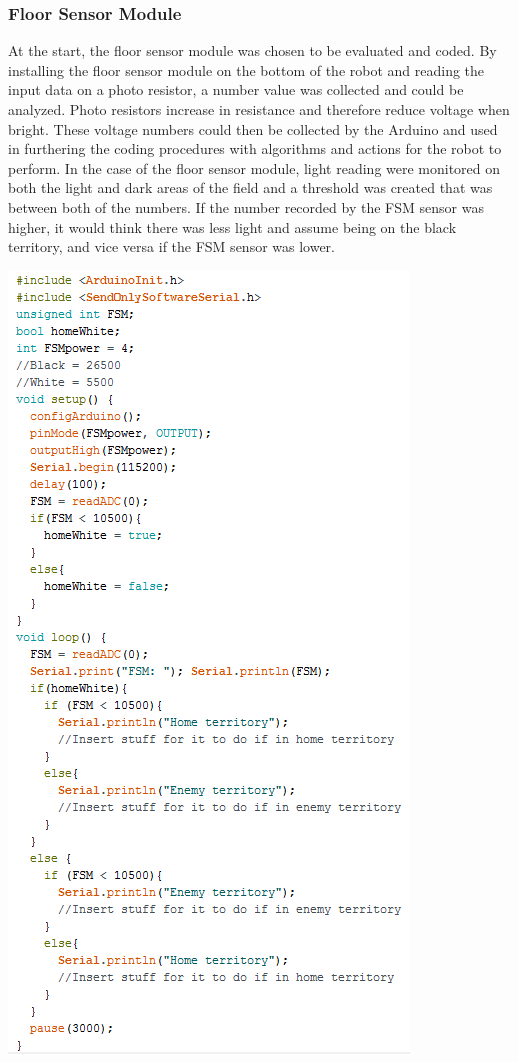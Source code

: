 \documentclass{article}
\begin{document}
    \subsubsection{Floor Sensor Module}
    At the start, the floor sensor module was chosen to be evaluated and coded. By installing the floor sensor module on the bottom of the robot and reading the input data on a photo resistor, a number value was collected and could be analyzed. Photo resistors increase in resistance and therefore reduce voltage when bright. These voltage numbers could then be collected by the Arduino and used in furthering the coding procedures with algorithms and actions for the robot to perform. In the case of the floor sensor module, light reading were monitored on both the light and dark areas of the field and a threshold was created that was between both of the numbers. If the number recorded by the FSM sensor was higher, it would think there was less light and assume being on the black territory, and vice versa if the FSM sensor was lower. \\
    
    \begin{center}
    \includegraphics[]{FSMCode.png}
    \end{center}
    
\end{document}
